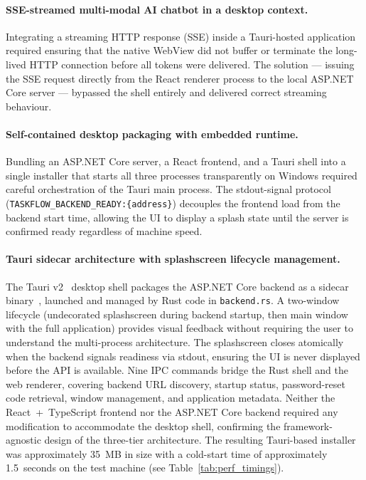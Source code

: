 \paragraph{SSE-streamed multi-modal AI chatbot in a desktop context.}
Integrating a streaming HTTP response (SSE) inside a Tauri-hosted application
required ensuring that the native WebView did not buffer or terminate the
long-lived HTTP connection before all tokens were delivered.
The solution --- issuing the SSE request directly from the React renderer process to
the local ASP.NET Core server --- bypassed the shell entirely and delivered
correct streaming behaviour.

\paragraph{Self-contained desktop packaging with embedded runtime.}
Bundling an ASP.NET Core server, a React frontend, and a Tauri shell into a single
installer that starts all three processes transparently on Windows
required careful orchestration of the Tauri main process.
The stdout-signal protocol (\texttt{TASKFLOW\_BACKEND\_READY:\{address\}}) decouples
the frontend load from the backend start time, allowing the UI to display a splash
state until the server is confirmed ready regardless of machine speed.

\paragraph{Tauri sidecar architecture with splashscreen lifecycle management.}
The Tauri v2~\cite{tauri_docs} desktop shell packages the ASP.NET Core backend
as a sidecar binary~\cite{tauri_sidecar}, launched and managed by Rust code
in \texttt{backend.rs}.
A two-window lifecycle (undecorated splashscreen during backend startup, then
main window with the full application) provides visual feedback without
requiring the user to understand the multi-process architecture.
The splashscreen closes atomically when the backend signals readiness via
stdout, ensuring the UI is never displayed before the API is available.
Nine IPC commands bridge the Rust shell and the web renderer, covering
backend URL discovery, startup status, password-reset code retrieval,
window management, and application metadata.
Neither the React~+~TypeScript frontend nor the ASP.NET Core
backend required any modification to accommodate the desktop shell,
confirming the framework-agnostic design of the three-tier architecture.
The resulting Tauri-based installer was approximately 35~MB in size with a
cold-start time of approximately 1.5~seconds on the test machine
(see Table~\ref{tab:perf_timings}).
